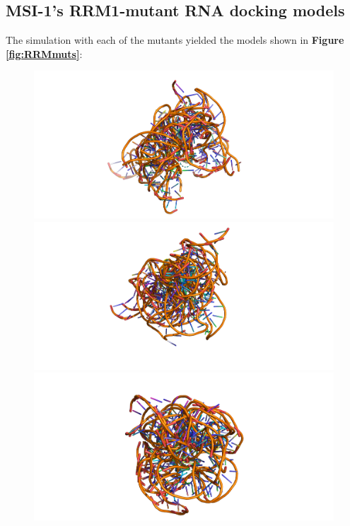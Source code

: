 \subsection{MSI-1's RRM1-mutant RNA docking models}

The simulation with each of the mutants yielded the models shown in \textbf{Figure \ref{fig:RRMmuts}}:

\begin{figure}[htbp!]
        \includegraphics[trim={6.5cm 0 6.5cm 0},clip,width=\linewidth]{assets/RMM1_mut1_ALL.png}
    \endminipage\hfill
        \includegraphics[trim={6.5cm 0 5.5cm 0},clip,width=\linewidth]{assets/RMM1_mut2_ALL.png}
    \endminipage\hfill
        \includegraphics[trim={6.5cm 0 7cm 0},clip,width=\linewidth]{assets/RMM1_mut3_ALL.png}

\end{figure}
